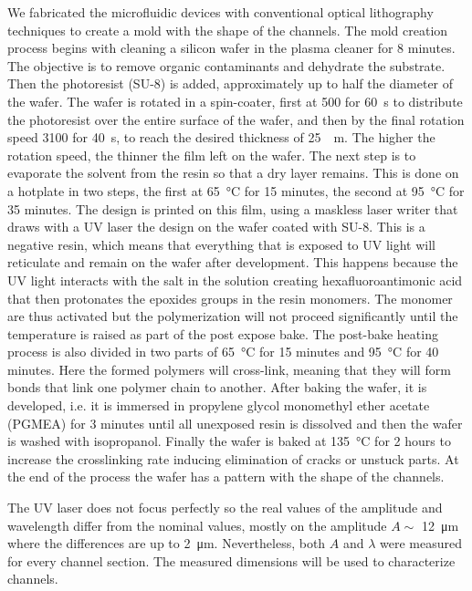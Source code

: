 We fabricated the microfluidic devices with conventional optical lithography techniques to create a mold with the shape of the channels. The mold creation process begins with cleaning a silicon wafer in the plasma cleaner for 8 minutes. The objective is to remove organic contaminants and dehydrate the substrate. Then the photoresist (SU-8) is added, approximately up to half the diameter of the wafer. The wafer is rotated in a spin-coater, first at \SI{500}{\rpm} for \SI{60}{\second} to distribute the photoresist over the entire surface of the wafer, and then by the final rotation speed \SI{3100}{\rpm} for \SI{40}{\second}, to reach the desired thickness of \SI{25}{\miro\meter}. The higher the rotation speed, the thinner the film left on the wafer. The next step is to evaporate the solvent from the resin so that a dry layer remains. This is done on a hotplate in two steps, the first at \SI{65}{\degreeCelsius} for 15 minutes, the second at \SI{95}{\degreeCelsius} for 35 minutes. The design is printed on this film, using a maskless laser writer that draws with a UV laser the design on the wafer coated with SU-8. This is a negative resin, which means that everything that is exposed to UV light will reticulate and remain on the wafer after development. This happens because the UV light interacts with the salt in the solution creating hexafluoroantimonic acid that then protonates the epoxides groups in the resin monomers. The monomer are thus activated but the polymerization will not proceed significantly until the temperature is raised as part of the post expose bake. The post-bake heating process is also divided in two parts of \SI{65}{\degreeCelsius} for 15 minutes and \SI{95}{\degreeCelsius} for 40 minutes. Here the formed polymers will cross-link, meaning that they will form bonds that link one polymer chain to another. After baking the wafer, it is developed, i.e. it is immersed in propylene glycol monomethyl ether acetate (PGMEA) for 3 minutes until all unexposed resin is dissolved and then the wafer is washed with isopropanol. Finally the wafer is baked at \SI{135}{\degreeCelsius} for 2 hours to increase the crosslinking rate inducing elimination of cracks or unstuck parts. At the end of the process the wafer has a pattern with the shape of the channels.

The UV laser does not focus perfectly so the real values of the amplitude and wavelength differ from the nominal values, mostly on the amplitude $A\sim$ \SI{12}{\micro\meter} where the differences are up to \SI{2}{\micro\meter}. Nevertheless, both $A$ and $\lambda$ were measured for every channel section. The measured dimensions will be used to characterize channels. 

